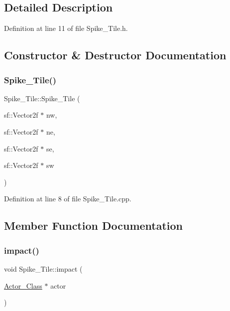 \subsection{Detailed Description}


Definition at line 11 of file Spike\+\_\+\+Tile.\+h.



\subsection{Constructor \& Destructor Documentation}
\hypertarget{class_spike___tile_a7752370ac92d839421a0405965fec127}{}\label{class_spike___tile_a7752370ac92d839421a0405965fec127} 
\subsubsection{\texorpdfstring{Spike\+\_\+\+Tile()}{Spike\_Tile()}}
{\footnotesize\ttfamily Spike\+\_\+\+Tile\+::\+Spike\+\_\+\+Tile (\begin{DoxyParamCaption}\item[{sf\+::\+Vector2f $\ast$}]{nw,  }\item[{sf\+::\+Vector2f $\ast$}]{ne,  }\item[{sf\+::\+Vector2f $\ast$}]{se,  }\item[{sf\+::\+Vector2f $\ast$}]{sw }\end{DoxyParamCaption})}



Definition at line 8 of file Spike\+\_\+\+Tile.\+cpp.



\subsection{Member Function Documentation}
\hypertarget{class_spike___tile_a8673c82f84733fe73c456eee725a6ab0}{}\label{class_spike___tile_a8673c82f84733fe73c456eee725a6ab0} 
\subsubsection{\texorpdfstring{impact()}{impact()}}
{\footnotesize\ttfamily void Spike\+\_\+\+Tile\+::impact (\begin{DoxyParamCaption}\item[{\hyperlink{class_actor___class}{Actor\+\_\+\+Class} $\ast$}]{actor }\end{DoxyParamCaption})\hspace{0.3cm}{\ttfamily [virtual]}}



